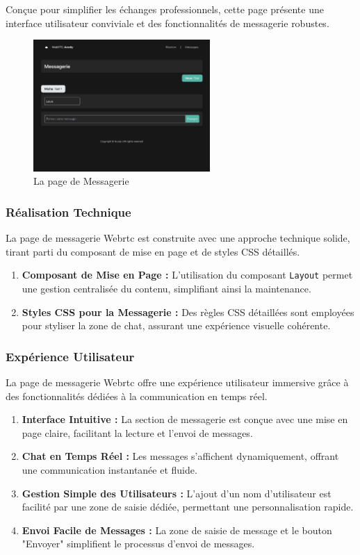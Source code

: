 \documentclass[12pt, a4paper, oneside]{article}
\begin{document}
Conçue pour simplifier les échanges professionnels, cette page présente une interface utilisateur conviviale et des fonctionnalités de messagerie robustes.

\begin{figure}[h]
  \centering
  \includegraphics[width=0.6\textwidth]{images/MessageriePres.png}
  \caption{La page de Messagerie}
\end{figure}

\subsubsection{Réalisation Technique}
La page de messagerie Webrtc est construite avec une approche technique solide, tirant parti du composant de mise en page et de styles CSS détaillés.

\begin{enumerate}
    \item \textbf{Composant de Mise en Page :} L'utilisation du composant \texttt{Layout} permet une gestion centralisée du contenu, simplifiant ainsi la maintenance.
    \item \textbf{Styles CSS pour la Messagerie :} Des règles CSS détaillées sont employées pour styliser la zone de chat, assurant une expérience visuelle cohérente.
\end{enumerate}

\subsubsection{Expérience Utilisateur}
La page de messagerie Webrtc offre une expérience utilisateur immersive grâce à des fonctionnalités dédiées à la communication en temps réel.

\begin{enumerate}
    \item \textbf{Interface Intuitive :} La section de messagerie est conçue avec une mise en page claire, facilitant la lecture et l'envoi de messages.
    \item \textbf{Chat en Temps Réel :} Les messages s'affichent dynamiquement, offrant une communication instantanée et fluide.
    \item \textbf{Gestion Simple des Utilisateurs :} L'ajout d'un nom d'utilisateur est facilité par une zone de saisie dédiée, permettant une personnalisation rapide.
    \item \textbf{Envoi Facile de Messages :} La zone de saisie de message et le bouton "Envoyer" simplifient le processus d'envoi de messages.
\end{enumerate}
\end{document}
